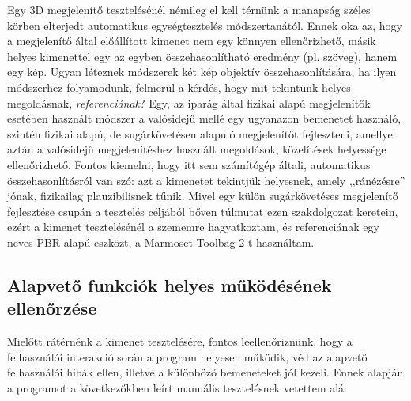 Egy 3D megjelenítő tesztelésénél némileg el kell térnünk a manapság széles körben elterjedt automatikus egységtesztelés módszertanától. Ennek oka az, hogy a megjelenítő által előállított kimenet nem egy könnyen ellenőrizhető, másik helyes kimenettel egy az egyben összehasonlítható eredmény (pl. szöveg), hanem egy kép. Ugyan léteznek módszerek két kép objektív összehasonlítására, ha ilyen módszerhez folyamodunk, felmerül a kérdés, hogy mit tekintünk helyes megoldásnak, \textit{referenciának}? Egy, az iparág által fizikai alapú megjelenítők esetében használt módszer a valósidejű mellé egy ugyanazon bemenetet használó, szintén fizikai alapú, de sugárkövetésen alapuló megjelenítőt fejleszteni, amellyel aztán a valósidejű megjelenítéshez használt megoldások, közelítések helyessége ellenőrizhető. Fontos kiemelni, hogy itt sem számítógép általi, automatikus összehasonlításról van szó: azt a kimenetet tekintjük helyesnek, amely ,,ránézésre'' jónak, fizikailag plauzibilisnek tűnik. Mivel egy külön sugárkövetéses megjelenítő fejlesztése csupán a tesztelés céljából bőven túlmutat ezen szakdolgozat keretein, ezért a kimenet tesztelésénél a szememre hagyatkoztam, és referenciának egy neves PBR alapú eszközt, a Marmoset Toolbag 2-t használtam.

\subsection{Alapvető funkciók helyes működésének ellenőrzése}

Mielőtt rátérnénk a kimenet tesztelésére, fontos leellenőriznünk, hogy a felhasználói interakció során a program helyesen működik, véd az alapvető felhasználói hibák ellen, illetve a különböző bemeneteket jól kezeli. Ennek alapján a programot a következőkben leírt manuális tesztelésnek vetettem alá:

\vspace{10pt}

